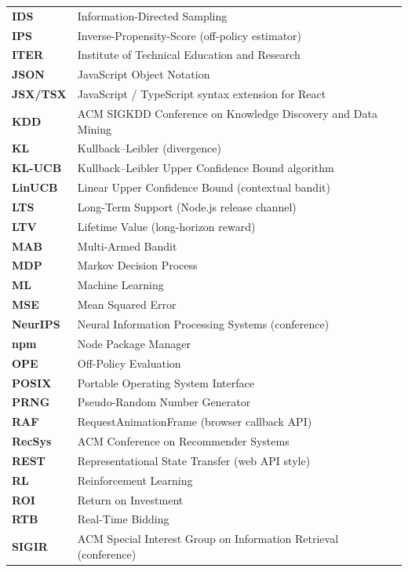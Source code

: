 \begin{xltabular}{\linewidth}{@{}p{3.5cm} X@{}}
\textbf{IDS}        & Information-Directed Sampling\\
\textbf{IPS}        & Inverse-Propensity-Score (off-policy estimator)\\
\textbf{ITER}       & Institute of Technical Education and Research\\
\textbf{JSON}       & JavaScript Object Notation\\
\textbf{JSX/TSX}    & JavaScript / TypeScript syntax extension for React\\
\textbf{KDD}        & ACM SIGKDD Conference on Knowledge Discovery and Data Mining\\
\textbf{KL}         & Kullback--Leibler (divergence)\\
\textbf{KL-UCB}     & Kullback--Leibler Upper Confidence Bound algorithm\\
\textbf{LinUCB}     & Linear Upper Confidence Bound (contextual bandit)\\
\textbf{LTS}        & Long-Term Support (Node.js release channel)\\
\textbf{LTV}        & Lifetime Value (long-horizon reward)\\
\textbf{MAB}        & Multi-Armed Bandit\\
\textbf{MDP}        & Markov Decision Process\\
\textbf{ML}         & Machine Learning\\
\textbf{MSE}        & Mean Squared Error\\
\textbf{NeurIPS}    & Neural Information Processing Systems (conference)\\
\textbf{npm}        & Node Package Manager\\
\textbf{OPE}        & Off-Policy Evaluation\\
\textbf{POSIX}      & Portable Operating System Interface\\
\textbf{PRNG}       & Pseudo-Random Number Generator\\
\textbf{RAF}        & RequestAnimationFrame (browser callback API)\\
\textbf{RecSys}     & ACM Conference on Recommender Systems\\
\textbf{REST}       & Representational State Transfer (web API style)\\
\textbf{RL}         & Reinforcement Learning\\
\textbf{ROI}        & Return on Investment\\
\textbf{RTB}        & Real-Time Bidding\\
\textbf{SIGIR}      & ACM Special Interest Group on Information Retrieval (conference)\\

\end{xltabular}
